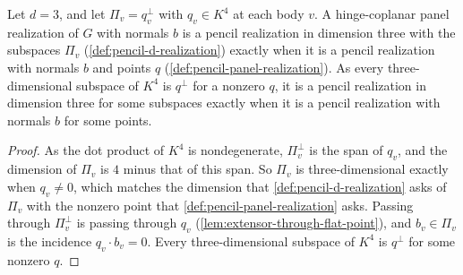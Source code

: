 \begin{lemma}
  \label{lem:pencil-d-agrees-three}
  \leanok
  Let $d = 3$, and let $\Pi_v = q_v^{\perp}$ with $q_v \in K^4$ at each
  body $v$. A hinge-coplanar panel realization of $G$ with normals $b$
  is a pencil realization in dimension three with the subspaces $\Pi_v$
  (\cref{def:pencil-d-realization}) exactly when it is a pencil
  realization with normals $b$ and points $q$
  (\cref{def:pencil-panel-realization}). As every three-dimensional
  subspace of $K^4$ is $q^{\perp}$ for a nonzero $q$, it is a pencil
  realization in dimension three for some subspaces exactly when it is a
  pencil realization with normals $b$ for some points.
\end{lemma}
\begin{proof}
  \leanok
  As the dot product of $K^4$ is nondegenerate, $\Pi_v^{\perp}$ is the
  span of $q_v$, and the dimension of $\Pi_v$ is $4$ minus that of this
  span. So $\Pi_v$ is three-dimensional exactly when $q_v \neq 0$, which
  matches the dimension that \cref{def:pencil-d-realization} asks of
  $\Pi_v$ with the nonzero point that
  \cref{def:pencil-panel-realization} asks. Passing through
  $\Pi_v^{\perp}$ is passing through $q_v$
  (\cref{lem:extensor-through-flat-point}), and $b_v \in \Pi_v$ is the
  incidence $q_v \cdot b_v = 0$. Every three-dimensional subspace of
  $K^4$ is $q^{\perp}$ for some nonzero $q$.
\end{proof}

